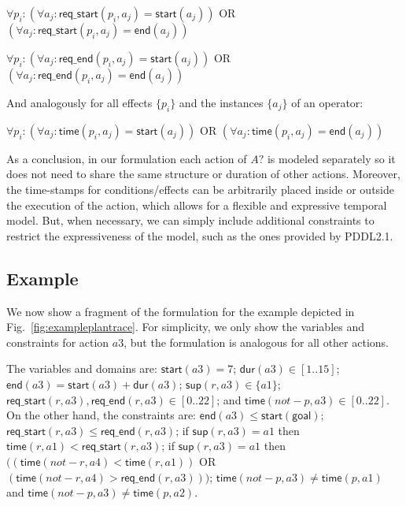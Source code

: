 \documentclass{ecai}
\newcommand{\dur}{\mathsf{dur}}    %
\newcommand{\start}{\mathsf{start}}%
\newcommand{\en}{\mathsf{end}}     %
\newcommand{\supp}{\mathsf{sup}}   %
\newcommand{\tim}{\mathsf{time}}   %
\newcommand{\reqs}{\mathsf{req\_{start}}} %
\newcommand{\reqe}{\mathsf{req\_{end}}}   %
\newcommand{\goal}{\mathsf{goal}}  %
\begin{document}
$\forall p_i: (\forall a_j: \reqs(p_i,a_j) = \start(a_j))$ OR $(\forall a_j: \reqs(p_i,a_j) = \en(a_j))$

$\forall p_i: (\forall a_j: \reqe(p_i,a_j) = \start(a_j))$ OR $(\forall a_j: \reqe(p_i,a_j) = \en(a_j))$

And analogously for all effects $\{p_i\}$ and the instances $\{a_j\}$ of an operator:

$\forall p_i: (\forall a_j: \tim(p_i,a_j) = \start(a_j))$ OR $(\forall a_j: \tim(p_i,a_j) = \en(a_j))$


As a conclusion, in our formulation each action of $A?$ is modeled separately so it does not need to share the same structure or duration of other actions. Moreover, the time-stamps for conditions/effects can be arbitrarily placed inside or outside the execution of the action, which allows for a flexible and expressive temporal model. But, when necessary, we can simply include additional constraints to restrict the expressiveness of the model, such as the ones provided by PDDL2.1.


\subsection{Example}
\label{sec:example}

We now show a fragment of the formulation for the example depicted in Fig.~\ref{fig:exampleplantrace}. For simplicity, we only show the variables and constraints for action $a3$, but the formulation is analogous for all other actions.

The variables and domains are: $\start(a3)=7$; $\dur(a3) \in [1..15]$; $\en(a3)=\start(a3)+\dur(a3)$; $\supp(r,a3) \in \{a1\}$; $\reqs(r,a3),\reqe(r,a3) \in [0..22]$; and $\tim(not-p,a3) \in [0..22]$.
On the other hand, the constraints are: $\en(a3) \leq \start(\goal)$; $\reqs(r,a3) \leq \reqe(r,a3)$; if $\supp(r,a3)=a1$ then $\tim(r,a1) < \reqs(r,a3)$; if $\supp(r,a3)=a1$ then $((\tim(not-r,a4) < \tim(r,a1))$ OR $(\tim(not-r,a4) > \reqe(r,a3)))$; $\tim(not-p,a3) \neq \tim(p,a1)$ and $\tim(not-p,a3) \neq \tim(p,a2)$.
\end{document}
